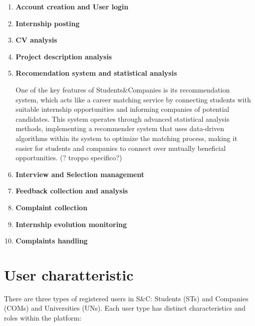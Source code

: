 \begin{enumerate}

\item \textbf{Account creation and User login}

\item \textbf{Internship posting}

\item \textbf{CV analysis}

\item \textbf{Project description analysis}

\item \textbf{Recomendation system and statistical analysis}

One of the key features of Students\&Companies is its recommendation system, which acts like a career matching service by connecting students with suitable internship opportunities and informing companies of potential candidates. This system operates through advanced statistical analysis methods, implementing a recommender system that uses data-driven algorithms within its system to optimize the matching process, making it easier for students and companies to connect over mutually beneficial opportunities. (? troppo specifico?)

\item \textbf{Interview and Selection management}

\item \textbf{Feedback collection and analysis}

\item \textbf{Complaint collection}

\item \textbf{Internship evolution monitoring}

\item \textbf{Complaints handling}

\end{enumerate}

\section{User charatteristic}

There are three types of registered users in S\&C: Students (STs) and Companies (COMs) and Universities (UNs). Each user type has distinct characteristics and roles within the platform:

